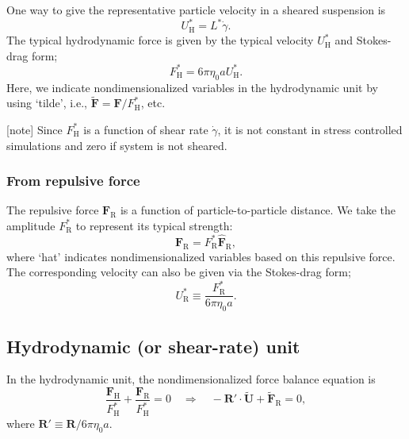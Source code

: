 \documentclass[fontsize=11pt]{scrartcl}
\begin{document}
One way to give the representative particle velocity
in a sheared suspension is
\begin{equation}
U_{\mathrm{H}}^{\ast} = L^{\ast} \dot{\gamma}.
\end{equation}
%
%
The typical hydrodynamic force is given
by the typical velocity $U_{\mathrm{H}}^{\ast} $
and Stokes-drag form;
\begin{equation}
  F_{\mathrm{H}}^{\ast} = 6 \pi \eta_0 a U_{\mathrm{H}}^{\ast}.
\end{equation}
Here, we indicate nondimensionalized variables
in the hydrodynamic unit by using `tilde',
i.e.,
$\tilde{\bm{F}}  = \bm{F}/ F_{\mathrm{H}}^{\ast} $,
etc.
%

[note]
Since $F_{\mathrm{H}}^{\ast}$ is a function of shear rate $\dot{\gamma}$,
it is not constant in stress controlled simulations
and zero if system is not sheared.


\subsubsection*{From repulsive force}

The repulsive force $\bm{F}_{\mathrm{R}}$ 
is a function of particle-to-particle distance.
%
We take the amplitude $F_{\mathrm{R}}^{\ast}$
to represent its typical strength:
%
\begin{equation}
 \bm{F}_{\mathrm{R}} =  F_{\mathrm{R}}^{\ast}
\hat{\bm{F}}_{\mathrm{R}},
\end{equation}
where `hat' indicates nondimensionalized variables
based on this repulsive force.
%
The corresponding velocity can also be
given via the Stokes-drag form;
\begin{equation}
 U^{\ast}_{\mathrm{R}}
  \equiv \frac{F_{\mathrm{R}}^{\ast}}{6\pi\eta_0 a}.
\end{equation}
%

\subsection*{Hydrodynamic (or shear-rate) unit}

In the hydrodynamic unit, the nondimensionalized
force balance equation is
\begin{equation}
 \frac{\bm{F}_{\mathrm{H}}}{F^{\ast}_{\mathrm{H}}}
  +
  \frac{\bm{F}_{\mathrm{R}}}{F^{\ast}_{\mathrm{H}}}  = 0
  \quad
  \Longrightarrow 
    \quad
 - \bm{R}' \cdot \tilde{\bm{U}} + \tilde{\bm{F}}_{\mathrm{R}} = 0,
\end{equation}
where
$\bm{R}' \equiv \bm{R} / 6 \pi \eta_0 a $.
\end{document}
